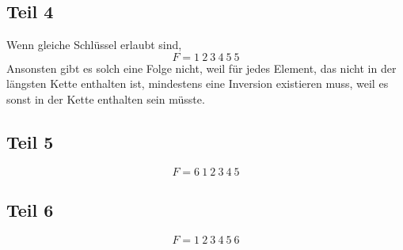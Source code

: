 \documentclass[10pt,a4paper]{article}
\begin{document}
\subsection{Teil 4}
Wenn gleiche Schlüssel erlaubt sind,
\begin{equation}
  F = 1\ 2\ 3\ 4\ 5\ 5
\end{equation}
Ansonsten gibt es solch eine Folge nicht, weil für jedes Element, das nicht in der längsten Kette enthalten ist, mindestens eine Inversion existieren muss, weil es sonst in der Kette enthalten sein müsste.

\subsection{Teil 5}
\begin{equation}
  F = 6\ 1\ 2\ 3\ 4\ 5
\end{equation}

\subsection{Teil 6}
\begin{equation}
  F = 1\ 2\ 3\ 4\ 5\ 6
\end{equation}
\end{document}
